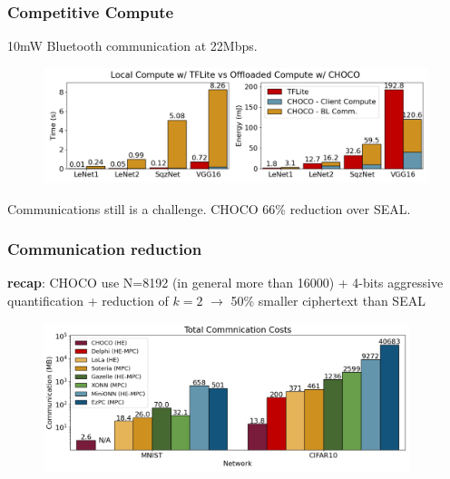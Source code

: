 \documentclass[10pt]{beamer}
\begin{document}
\begin{frame}
    \frametitle{Competitive Compute}
    10mW Bluetooth communication at 22Mbps.

    \begin{figure}
        \includegraphics[width=1\textwidth]{energy.png}
    \end{figure}
\pause

    Communications still is a challenge. CHOCO 66\% reduction over SEAL.


\end{frame}




\begin{frame}
    \frametitle{Communication reduction}
    \textbf{recap}: CHOCO use N=8192 (in general more than 16000) +
    4-bits aggressive quantification + reduction of $k=2$ $\rightarrow$ 50\% smaller ciphertext than SEAL


    \begin{figure}
        \includegraphics[width=0.95\textwidth]{comunication.png}
    \end{figure}

\end{frame}
%
%
%
\end{document}
